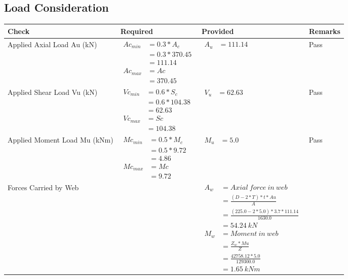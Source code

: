 \documentclass{article}%
\begin{document}
\subsection{Load Consideration}%
\label{subsec:LoadConsideration}%
\renewcommand{\arraystretch}{1.2}%
\begin{longtable}{|p{4cm}|p{3.5cm}|p{6.5cm}|p{1.5cm}|}%
\hline%
\rowcolor{OsdagGreen}%
Check&Required&Provided&Remarks\\%
\hline%
\endhead%
\hline%
Applied Axial Load Au (kN)&$\begin{aligned} Ac_{min} &= 0.3 * A_c\\ &= 0.3 *370.45\\ &=111.14\\ Ac_{max} &= Ac \\ &=370.45\end{aligned}$&$\begin{aligned} A_u &=111.14\end{aligned}$&Pass\\%
\hline%
Applied Shear Load Vu (kN)&$\begin{aligned} Vc_{min} &= 0.6 * S_c\\ &= 0.6 *104.38\\ &=62.63\\ Vc_{max} &= Sc \\ &=104.38\end{aligned}$&$\begin{aligned} V_u &=62.63\end{aligned}$&Pass\\%
\hline%
Applied Moment Load Mu (kNm)&$\begin{aligned} Mc_{min} &= 0.5 * M_c\\ &= 0.5 *9.72\\ &=4.86\\  Mc_{max} &= Mc \\ &=9.72\end{aligned}$&$\begin{aligned} M_u &=5.0\end{aligned}$&Pass\\%
\hline%
Forces Carried by Web&&$\begin{aligned}A_w &= Axial~ force~ in~ web  \\   &= \frac{(D- 2*T)*t* Au }{A} \\ &= \frac{(225.0- 2*5.0)*3.7*111.14 }{1630.0} \\ &=54.24~ kN\\ M_w &= Moment ~in ~web  \\  &= \frac{Z_w * Mu}{Z} \\ &= \frac{42758.12 * 5.0}{129300.0} \\ &=1.65~{kNm}\end{aligned}$&\\%

\end{longtable}
\end{document}
